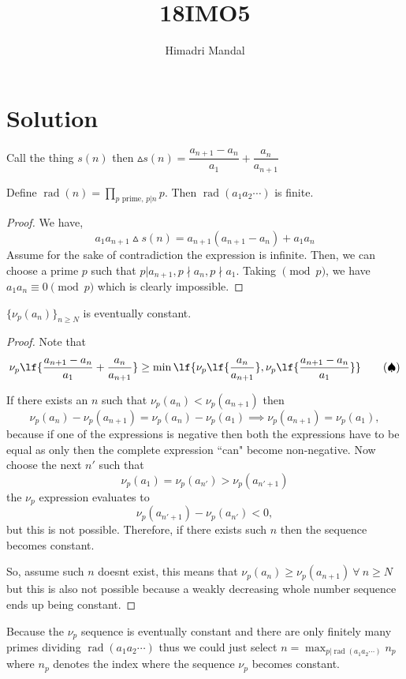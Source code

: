 \documentclass[11pt]{scrartcl}
\title{18IMO5}
\author{Himadri Mandal}
\begin{document}
\maketitle

\section{Solution}
\newcommand{\vp}{\nu_p}
\begin{soln}

\raggedright
\text{ }


Call the thing $s(n)$ then $\vartriangle s(n) = \dfrac{a_{n+1}-a_n}{a_1} + \dfrac{a_n}{a_{n+1}}$
\begin{claim*}
	Define $\operatorname{rad}(n) = \displaystyle\prod_{p \text{ prime, } p|n} p$. Then $\operatorname{rad}(a_1a_2\cdots)$ is finite.
\end{claim*}
\begin{proof}
	We have, 
	\[ a_1 a_{n+1} \vartriangle s(n) = a_{n+1}(a_{n+1} - a_n) + a_1 a_n \]
	Assume for the sake of contradiction the expression is infinite. Then, we can choose a prime $p$ such that $p|a_{n+1}, p\nmid a_n, p\nmid a_1$. Taking $\pmod{p}$, we have $a_1a_n \equiv 0 \pmod{p}$ which is clearly impossible.
\end{proof}
\begin{proposition*}
	$\{\nu_p(a_n)\}_{n \geq N}$ is eventually constant.
\end{proposition*}
\begin{proof}
	Note that 
		\[\vp\lf{\dfrac{a_{n+1}-a_n}{a_1} + \dfrac{a_{n}}{a_{n+1}}} \geq \min\lf{\vp\lf{\dfrac{a_{n}}{a_{n+1}}}, \vp\lf{\dfrac{a_{n+1}-a_{n}}{a_1}}} \tag{$\spadesuit$} \]

	If there exists an $n$ such that $\nu_p(a_n) < \nu_p(a_{n+1})$ then 
	\[\vp(a_n) - \vp(a_{n+1}) = \vp(a_n) - \vp(a_1) \implies \vp(a_{n+1}) = \vp(a_1), \] 
	because if one of the expressions is negative then both the expressions have to be equal as only then the complete expression ``can" become non-negative. Now choose the next $n'$ such that
	\[\vp(a_1)=\vp(a_{n'}) > \vp(a_{n'+1})\]
	the $\vp$ expression evaluates to \[\vp(a_{n'+1}) - \vp(a_{n'}) < 0, \] but this is not possible. Therefore, if there exists such $n$ then the sequence becomes constant. 

	So, assume such $n$ doesnt exist, this means that $\vp(a_n) \geq \vp(a_{n+1}) \ \forall \ n \geq N $ but this is also not possible because a weakly decreasing whole number sequence ends up being constant.
\end{proof}

Because the $\vp$ sequence is eventually constant and there are only finitely many primes dividing $\operatorname{rad}(a_1a_2\cdots)$ thus we could just select $n = \displaystyle\max_{p|\operatorname{rad}(a_1a_2\cdots)}n_p$ where $n_p$ denotes the index where the sequence $\vp$ becomes constant.
\end{soln}
\end{document}
